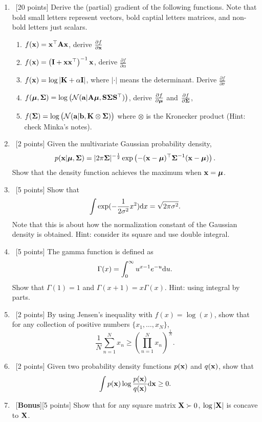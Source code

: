\documentclass[12pt, fullpage,letterpaper]{article}
\begin{document}
\begin{enumerate}
\item~[20 points] Derive the (partial) gradient of the following functions. Note that bold small letters represent vectors, bold captial letters matrices, and non-bold letters just scalars.
\begin{enumerate}
	\item $f({\bf x}) = {\bf x}^\top {\bf A} {\bf x}$, derive $\frac{\partial f}{\partial {\bf x}}$
	\item $f({\bf x})  =\left({\bf I} + {\bf x}{\bf x}^\top\right)^{-1} {\bf x}$, derive $\frac{\partial f}{\partial \alpha}$
	\item $f({\bf x}) = \log |{\bf K} + \alpha {\bf I}|$, where $|\cdot|$ means the determinant. Derive $\frac{\partial f}{\partial \sigma}$
	\item $f(\boldsymbol{\mu}, \boldsymbol{\Sigma}) = \log\big(\mathcal{N}({\bf a}|{\bf A}\boldsymbol{\mu}, {\bf S}\boldsymbol{\Sigma}{\bf S}^\top)\big)$, derive $\frac{\partial f}{\partial \boldsymbol{\mu}}$ and $\frac{\partial f}{\partial \boldsymbol{\Sigma}}$,
	\item $f(\boldsymbol{\Sigma}) = \log\big(\mathcal{N}({\bf a}|{\bf b}, {\bf K}\otimes \boldsymbol{\Sigma})\big)$ where $\otimes$ is the Kronecker product (Hint: check Minka's notes).
\end{enumerate}
\item~[2 points] Given the multivariate Gaussian probability density, $$p({\bf x}|\boldsymbol{\mu}, \boldsymbol{\Sigma}) = |2\pi \boldsymbol{\Sigma}|^{-\frac{1}{2}}\exp\left(- ({\bf x}-\boldsymbol{\mu})^\top\boldsymbol{\Sigma}^{-1}({\bf x}-\boldsymbol{\mu})\right).$$ Show that the density function achieves the maximum when ${\bf x} = \boldsymbol{\mu}$.  
\item~[5 points] Show that $$\int \exp(-\frac{1}{2\sigma^2}x^2) {\rm d} x = \sqrt{2\pi \sigma^2}.$$ Note that this is about  how the normalization constant of the Gaussian density is obtained. Hint: consider its square and use double integral. 
\item~[5 points] The gamma function is defined as $$\Gamma(x) = \int_0^\infty u^{x-1}e^{-u} {\rm d} u.$$ Show that $\Gamma(1) = 1$ and $\Gamma(x+1) = x\Gamma(x)$. Hint: using integral by parts. 
\item~[2 points] By using Jensen's inequality with $f(x) = \log(x)$, show that for any collection of positive numbers $\{x_1, \ldots, x_N\}$,
$$\frac{1}{N}\sum_{n=1}^N x_n \ge \left(\prod_{n=1}^N x_n\right)^{\frac{1}{N}}.$$
\item~[2 points] Given two probability density functions $p({\bf x})$ and $q({\bf x})$, show that $$\int p({\bf x})\log\frac{p({\bf x})}{q({\bf x})}{\rm d} {\bf x} \ge 0.$$
\item~[\textbf{Bonus}][5 points] Show that for any square matrix ${\bf X} \succ 0$, $\log\left| {\bf X} \right|$ is concave to ${\bf X}$. 
\end{enumerate}
\end{document}
